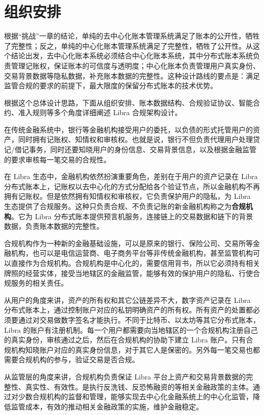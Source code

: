 \section{组织安排}\label{sec:arrangement}
根据“挑战”一章的结论，单纯的去中心化账本管理系统满足了账本的公开性，牺牲了完整性；反之，单纯的中心化账本管理系统满足了完整性，牺牲了公开性。从这个结论出发，去中心化账本系统必须结合中心化账本系统，其中分布式账本系统负责管理记账权，保证账本的可信度与透明度；中心化账本负责管理用户真实身份、交易背景数据等隐私数据，补充账本数据的完整性。这种设计路线的要点是：满足监管合规的要求的前提下，最大限度的保留分布式账本的技术优势。

根据这个总体设计思路，下面从组织安排、账本数据结构、合规验证协议、智能合约、准入规则等多个角度详细阐述 Libra 合规架构设计。

在传统金融系统中，银行等金融机构接受用户的委托，以负债的形式托管用户的资产，同时拥有记账权、知情权和审核权。也就是说，银行不但负责代理用户处理贷记/借记事务，同时还要知晓用户的身份信息、交易背景信息，以及根据金融监管的要求审核每一笔交易的合规性。

在 Libra 生态中，金融机构依然扮演重要角色，差别在于用户的资产记录在 Libra 分布式账本上，记账权以去中心化的方式分配给各个验证节点，所以金融机构不再拥有记账权。但是依然拥有知情权和审核权，它负责保护用户的隐私，为 Libra 生态提供了合规服务。这种只负责合规、不负责记账的新金融机构称之为\textbf{合规机构}。它为 Libra 分布式账本提供预言机服务，连接链上的交易数据和链下的背景数据，负责账本数据的完整性。

合规机构作为一种新的金融基础设施，可以是原来的银行、保险公司、交易所等金融机构，也可以是电信运营商、电子商务平台等非传统金融机构，甚至监管机构可以直接作为合规机构。合规机构是中心化的，需要信用背书，所以它必须持有相关牌照的经营实体，接受当地辖区的金融监管，能够有效的保护用户的隐私、行使合规服务的相关责任。

从用户的角度来讲，资产的所有权和其它公链差异不大，数字资产记录在 Libra 分布式账本上，通过控制账户对应的私钥明确资产的所有权。所有资产的处置都必须要通过对交易做数字签名才能执行。不同于比特币、以太坊等其它分布式账本，Libra 的账户有注册机制。每一个用户都需要向当地辖区的一个合规机构注册自己的真实身份，审核通过之后，然后在合规机构的协助下建立 Libra 账户。只有合规机构知晓账户对应的真实身份信息，对于其它人是保密的。另外每一笔交易也都需要合规机构的参与，验证交易是否合规。

从监管层的角度来讲，合规机构负责保证 Libra 平台上资产和交易背景数据的完整性、真实性、有效性。是执行反洗钱、反恐怖融资的等相关金融政策的主体。通过对少数合规机构的监督和管理，能够实现去中心化金融系统上的中心化监管，降低监管成本，有效的推动相关金融政策的实施，维护金融稳定。

